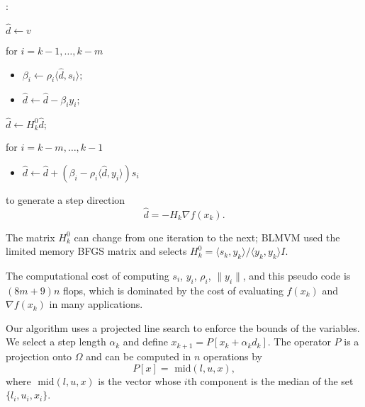 \begin{Algorithm} [ht]
:
\begin{list}{}
{
\setlength{\parsep}{0pt}
\setlength{\itemsep}{0pt}
\setlength{\topsep}{0pt}
}
\item $\hat d \leftarrow  v$
\item for $i=k-1, \ldots, k-m $

\begin{itemize}
\item $\beta_i \leftarrow { \rho_i}{\langle \hat d, s_i \rangle } ;$
\item $\hat d \leftarrow \hat d - \beta_i y_i;$
\end{itemize}

\item $\hat d \leftarrow H_k^0 \hat d ;$

\item for $i= k-m, \ldots, k-1$
\begin{itemize}
\item $\hat d \leftarrow \hat d + \left( \beta_i - { \rho_i }{ \langle \hat d , y_i \rangle 
} \right) s_i $
\end{itemize}

\end{list}
\end{Algorithm}


to generate a step direction 
\[\hat d = - H_k \nabla f(x_k) .\]

The matrix $H_k^0$ can change from one iteration to the next; 
BLMVM used the limited memory BFGS matrix and selects
$H_k^0 = \langle s_k , y_k \rangle / \langle y_k , y_k \rangle I$.

The computational cost of computing $s_i$, $y_i$, $\rho_i$, $\|y_i\|$, and
this pseudo code is $(8m+9)n$ flops, which
is dominated by the
cost of evaluating $f(x_k)$ and $\nabla f(x_k)$ in many applications.



Our algorithm uses a projected line search to
enforce the bounds of the variables.
We select a step length $\alpha_k$ and
define $x_{k+1} = P [x_k + \alpha_k {d_k} ]$.
The operator $P$ is a projection
onto $\Omega$ and can be computed in $n$ operations by
\[ 
P[x] = \mbox{ mid} (l,u,x), 
\]
where $\mbox{ mid} (l,u,x)$ is the vector whose $i${th} component
is the median of the set $\{ l_i, u_i, x_i \} $.

